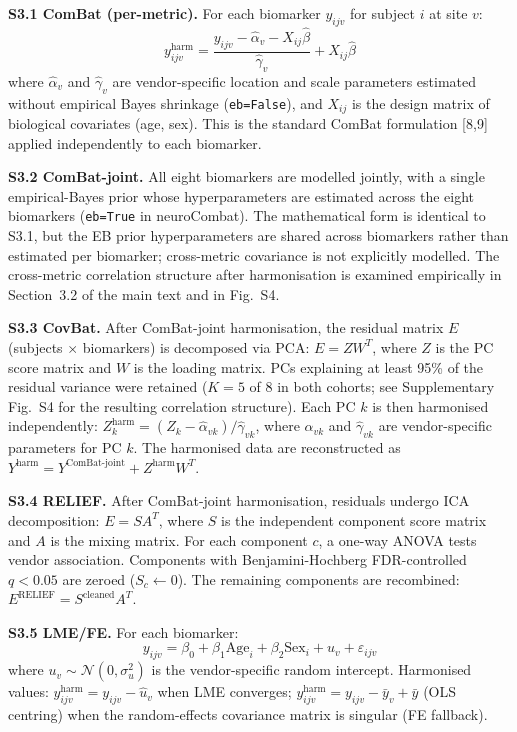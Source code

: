 \documentclass[12pt,a4paper]{article}
\begin{document}
\textbf{S3.1 ComBat (per-metric).} For each biomarker $y_{ijv}$ for subject $i$ at site $v$:
\begin{equation*}
y_{ijv}^{\text{harm}} = \frac{y_{ijv} - \hat{\alpha}_v - X_{ij}\hat{\beta}}{\hat{\gamma}_v} + X_{ij}\hat{\beta}
\end{equation*}
where $\hat{\alpha}_v$ and $\hat{\gamma}_v$ are vendor-specific location and scale parameters estimated without empirical Bayes shrinkage (\texttt{eb=False}), and $X_{ij}$ is the design matrix of biological covariates (age, sex). This is the standard ComBat formulation [8,9] applied independently to each biomarker.

\textbf{S3.2 ComBat-joint.} All eight biomarkers are modelled jointly, with a single empirical-Bayes prior whose hyperparameters are estimated across the eight biomarkers (\texttt{eb=True} in neuroCombat). The mathematical form is identical to S3.1, but the EB prior hyperparameters are shared across biomarkers rather than estimated per biomarker; cross-metric covariance is not explicitly modelled. The cross-metric correlation structure after harmonisation is examined empirically in Section~3.2 of the main text and in Fig.~S4.

\textbf{S3.3 CovBat.} After ComBat-joint harmonisation, the residual matrix $E$ (subjects $\times$ biomarkers) is decomposed via PCA: $E = ZW^T$, where $Z$ is the PC score matrix and $W$ is the loading matrix. PCs explaining at least 95\% of the residual variance were retained ($K=5$ of 8 in both cohorts; see Supplementary Fig.~S4 for the resulting correlation structure). Each PC $k$ is then harmonised independently: $Z_{k}^{\text{harm}} = (Z_k - \hat{\alpha}_{vk})/\hat{\gamma}_{vk}$, where $\hat{\alpha}_{vk}$ and $\hat{\gamma}_{vk}$ are vendor-specific parameters for PC $k$. The harmonised data are reconstructed as $Y^{\text{harm}} = Y^{\text{ComBat-joint}} + Z^{\text{harm}}W^T$.

\textbf{S3.4 RELIEF.} After ComBat-joint harmonisation, residuals undergo ICA decomposition: $E = SA^T$, where $S$ is the independent component score matrix and $A$ is the mixing matrix. For each component $c$, a one-way ANOVA tests vendor association. Components with Benjamini-Hochberg FDR-controlled $q < 0.05$ are zeroed ($S_c \leftarrow 0$). The remaining components are recombined: $E^{\text{RELIEF}} = S^{\text{cleaned}}A^T$.

\textbf{S3.5 LME/FE.} For each biomarker:
\begin{equation*}
y_{ijv} = \beta_0 + \beta_1 \text{Age}_i + \beta_2 \text{Sex}_i + u_v + \varepsilon_{ijv}
\end{equation*}
where $u_v \sim \mathcal{N}(0, \sigma_u^2)$ is the vendor-specific random intercept. Harmonised values: $y_{ijv}^{\text{harm}} = y_{ijv} - \hat{u}_v$ when LME converges; $y_{ijv}^{\text{harm}} = y_{ijv} - \bar{y}_v + \bar{y}$ (OLS centring) when the random-effects covariance matrix is singular (FE fallback).
\end{document}
